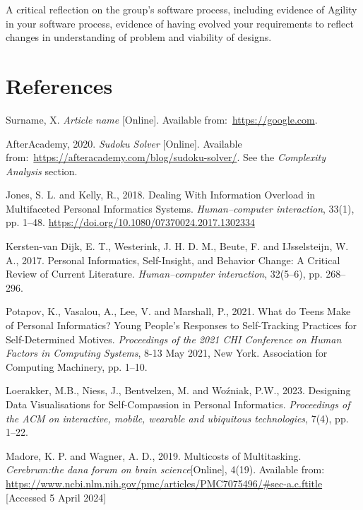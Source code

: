 \documentclass[12pt]{article}
\begin{document}
A critical reflection on the group’s software process, including evidence of Agility in
your software process, evidence of having evolved your requirements to reflect
changes in understanding of problem and viability of designs.


\section{References}

\renewcommand{\refname}{} 
\vspace{-20pt}
\begin{thebibliography}{99}
     Surname, X. \textit{Article name} [Online].
    Available from:~\url{https://google.com}.

     AfterAcademy, 2020. \textit{Sudoku Solver} [Online].
    Available from:~\url{https://afteracademy.com/blog/sudoku-solver/}. See the
    \textit{Complexity Analysis} section.

    Jones, S. L. and Kelly, R., 2018. 
    Dealing With Information Overload in Multifaceted Personal Informatics Systems. 
    \textit{Human–computer interaction}, 33(1), pp. 1–48. \url{https://doi.org/10.1080/07370024.2017.1302334}

    Kersten-van Dijk, E. T., Westerink, J. H. D. M., Beute, F. and 
    IJsselsteijn, W. A., 2017. 
    Personal Informatics, Self-Insight, and Behavior Change: A Critical Review of Current Literature. 
    \textit{Human–computer interaction}, 32(5–6), pp. 268–296.

    Potapov, K., Vasalou, A., Lee, V. and Marshall, P., 2021. 
    What do Teens Make of Personal Informatics? 
    Young People's Responses to Self-Tracking Practices for Self-Determined Motives. 
    \textit{Proceedings of the 2021 CHI Conference on Human Factors in Computing Systems}, 
    8-13 May 2021, New York. Association for Computing Machinery, pp. 1–10.

    Loerakker, M.B., Niess, J., Bentvelzen, M. and Woźniak, P.W., 2023. 
    Designing Data Visualisations for Self-Compassion in Personal Informatics. 
    \textit{Proceedings of the ACM on interactive, mobile, wearable and ubiquitous technologies}, 7(4), pp. 1–22.

    Madore, K. P. and Wagner, A. D., 2019. Multicosts of Multitasking. 
    \textit{Cerebrum:the dana forum on brain science}[Online], 4(19). Available from:
    \url{https://www.ncbi.nlm.nih.gov/pmc/articles/PMC7075496/#sec-a.c.ftitle} 
    [Accessed 5 April 2024]


\end{thebibliography}
\end{document}
